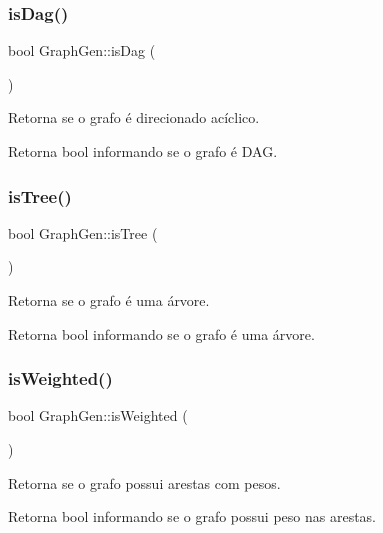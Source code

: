 \subsubsection{\texorpdfstring{is\+Dag()}{isDag()}}
{\footnotesize\ttfamily bool Graph\+Gen\+::is\+Dag (\begin{DoxyParamCaption}{ }\end{DoxyParamCaption})}

Retorna se o grafo é direcionado acíclico. \begin{DoxyReturn}{Retorna}
bool informando se o grafo é D\+AG. 
\end{DoxyReturn}
\mbox{\label{classGraphGen_adffd99540a68b2c158cc1b089ccfd550}} 
\subsubsection{\texorpdfstring{is\+Tree()}{isTree()}}
{\footnotesize\ttfamily bool Graph\+Gen\+::is\+Tree (\begin{DoxyParamCaption}{ }\end{DoxyParamCaption})}

Retorna se o grafo é uma árvore. \begin{DoxyReturn}{Retorna}
bool informando se o grafo é uma árvore. 
\end{DoxyReturn}
\mbox{\label{classGraphGen_aa0069b56cfa3e2d7d596bda9ba4ccc2b}} 
\subsubsection{\texorpdfstring{is\+Weighted()}{isWeighted()}}
{\footnotesize\ttfamily bool Graph\+Gen\+::is\+Weighted (\begin{DoxyParamCaption}{ }\end{DoxyParamCaption})}

Retorna se o grafo possui arestas com pesos. \begin{DoxyReturn}{Retorna}
bool informando se o grafo possui peso nas arestas. 
\end{DoxyReturn}
\mbox{\label{classGraphGen_a7811947062c0aa0fd1c56af0442dc9ad}} 
